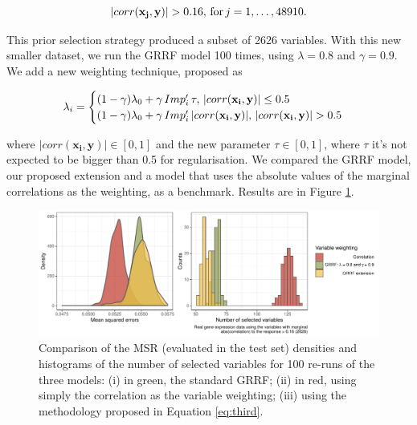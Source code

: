 \documentclass[]{article}
\begin{document}
\begin{equation}
|corr(\mathbf{x_j}, \mathbf{y})| > 0.16, \thinspace
\text{for} \thinspace j = 1,\dots,48910.
\end{equation}

This prior selection strategy produced a subset of 2626 variables. With
this new smaller dataset, we run the GRRF model 100 times, using
\(\lambda = 0.8\) and \(\gamma = 0.9\). We add a new weighting
technique, proposed as

\begin{equation}
\label{eq:third}
\lambda_i = 
\begin{cases}
(1 - \gamma) \lambda_0 + \gamma \thinspace Imp'_{i} \thinspace\tau, \thinspace
|corr(\mathbf{x_i}, \mathbf{y})| \leq 0.5 \\
(1 - \gamma) \lambda_0 + \gamma \thinspace Imp'_{i}  \thinspace
|corr(\mathbf{x_i}, \mathbf{y})|, \thinspace
|corr(\mathbf{x_i}, \mathbf{y})| > 0.5
\end{cases}
\end{equation}

where \(|corr(\mathbf{x_i}, \mathbf{y})| \in [0,1]\) and the new
parameter \(\tau \in [0,1]\), where \(\tau\) it's not expected to be
bigger than 0.5 for regularisation. We compared the GRRF model, our
proposed extension and a model that uses the absolute values of the
marginal correlations as the weighting, as a benchmark. Results are in
Figure \ref{fig:weights}.

\begin{figure}[H]

{\centering \includegraphics[width=1.1\linewidth,height=0.45\textheight]{img/weigh} 

}

\caption{Comparison of the MSR (evaluated in the test set) densities and histograms of the number of selected variables for 100 re-runs of the three models: (i) in green, the standard GRRF; (ii) in red, using simply the correlation as the variable weighting; (iii) using the methodology proposed in Equation \ref{eq:third}.}\label{fig:weights}
\end{figure}
\end{document}

